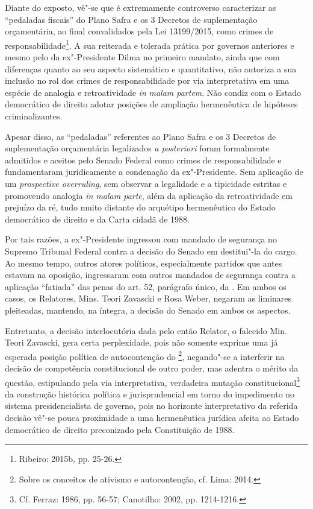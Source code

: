 Diante do exposto, vê"-se que é extremamente controverso caracterizar as
``pedaladas fiscais'' do Plano Safra e os 3 Decretos de suplementação
orçamentária, ao final convalidados pela Lei 13199/2015, como crimes de
responsabilidade\footnote{Ribeiro: 2015b, pp. 25-26.}. A sua reiterada e tolerada
prática por governos anteriores e mesmo pelo da ex"-Presidente Dilma no
primeiro mandato, ainda que com diferenças quanto ao seu aspecto
sistemático e quantitativo, não autoriza a sua inclusão no rol dos
crimes de responsabilidade por via interpretativa em uma espécie de
analogia e retroatividade \emph{in} \emph{malam partem}. Não condiz com
o Estado democrático de direito adotar posições de ampliação
hermenêutica de hipóteses criminalizantes.

Apesar disso, as ``pedaladas'' referentes ao Plano Safra e os 3 Decretos
de suplementação orçamentária legalizados \emph{a posteriori} foram
formalmente admitidos e aceitos pelo Senado Federal como crimes de
responsabilidade e fundamentaram juridicamente a condenação da
ex"-Presidente. Sem aplicação de um \emph{prospective overruling}, sem
observar a legalidade e a tipicidade estritas e promovendo analogia
\emph{in malam parte}, além da aplicação da retroatividade em prejuízo
da ré, tudo muito distante do arquétipo hermenêutico do Estado
democrático de direito e da Carta cidadã de 1988.

Por tais razões, a ex"-Presidente ingressou com mandado de segurança no
Supremo Tribunal Federal contra a decisão do Senado em destitui"-la do
cargo. Ao mesmo tempo, outros atores políticos, especialmente partidos
que antes estavam na oposição, ingressaram com outros mandados de
segurança contra a aplicação ``fatiada'' das penas do art. 52, parágrafo
único, da . Em ambos os casos, os Relatores, Mins. Teori Zavascki e
Rosa Weber, negaram as liminares pleiteadas, mantendo, na íntegra, a
decisão do Senado em ambos os aspectos.

Entretanto, a decisão interlocutória dada pelo então Relator, o falecido
Min. Teori Zavascki, gera certa perplexidade, pois não somente exprime
uma já esperada posição política de autocontenção do \footnote{Sobre
  os conceitos de ativismo e autocontenção, cf. Lima: 2014.}, negando"-se
a interferir na decisão de competência constitucional de outro poder,
mas adentra o mérito da questão, estipulando pela via interpretativa,
verdadeira mutação constitucional\footnote{Cf. Ferraz: 1986, pp. 56-57;
Canotilho: 2002, pp. 1214-1216.} da construção histórica política e
jurisprudencial em torno do impedimento no sistema presidencialista de
governo, pois no horizonte interpretativo da referida decisão vê"-se
pouca proximidade a uma hermenêutica jurídica afeita ao Estado
democrático de direito preconizado pela Constituição de 1988.

